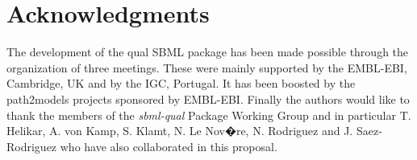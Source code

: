 
\section{Acknowledgments}
	\label{sec:acknowledgements}
	\label{sec:acknowledgments}
	
	The development of the qual SBML package has been made possible through the organization of three meetings. These were mainly supported by the EMBL-EBI, Cambridge, UK and by the IGC, Portugal. It has been boosted by the path2models projects sponsored by EMBL-EBI. Finally the authors would like to thank the members of the \textit{sbml-qual} Package Working Group and in particular T. Helikar, A. von Kamp, S. Klamt, N. Le Nov�re, N. Rodriguez and J. Saez-Rodriguez who have also collaborated in this proposal.
